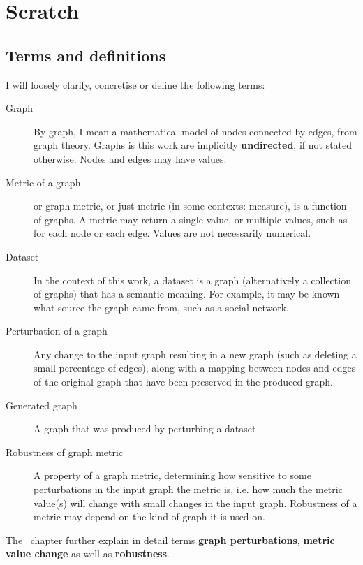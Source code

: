 \setcounter{chapter}{-1}

\chapter{Scratch}

\section{Terms and definitions}

I will loosely clarify, concretise or define the following terms:

\begin{description}
    \item[Graph]
    By graph, I mean a mathematical model of nodes connected by edges, from graph theory.
    Graphs is this work are implicitly \textbf{undirected}, if not stated otherwise.
    Nodes and edges may have values.

    \item[Metric of a graph]
    or graph metric, or just metric (in some contexts: measure), is a function of graphs.
    A metric may return a single value, or multiple values, such as for each node or each edge.
    Values are not necessarily numerical.

    \item [Dataset]
    In the context of this work, a dataset is a graph (alternatively a collection of graphs) that has a semantic meaning.
    For example, it may be known what source the graph came from, such as a social network.

    \item[Perturbation of a graph]
    Any change to the input graph resulting in a new graph (such as deleting a small percentage of edges), along with a mapping between nodes and edges of the original graph that have been preserved in the produced graph.

    \item[Generated graph]
    A graph that was produced by perturbing a dataset

    \item[Robustness of graph metric]
    A property of a graph metric, determining how sensitive to some perturbations in the input graph the metric is, i.e. how much the metric value(s) will change with small changes in the input graph.
    Robustness of a metric may depend on the kind of graph it is used on.
\end{description}

The~ chapter further explain in detail terms \textbf{graph perturbations}, \textbf{metric value change} as well as \textbf{robustness}.
